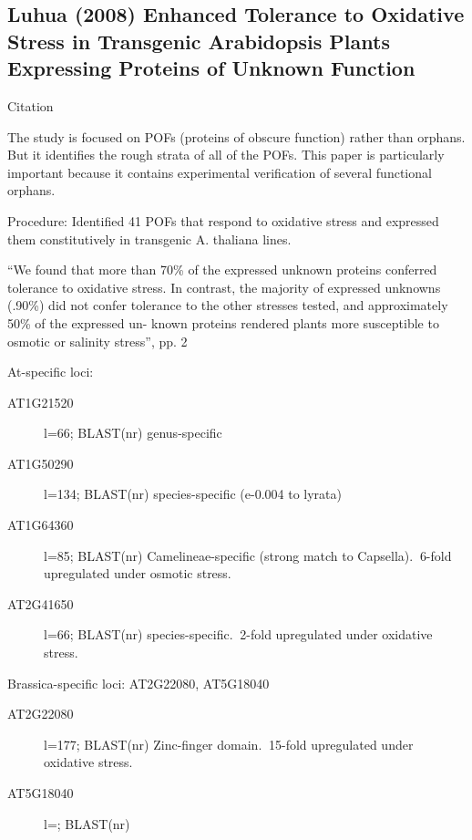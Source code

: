     
\subsection{Luhua (2008) Enhanced Tolerance to Oxidative Stress in Transgenic
Arabidopsis Plants Expressing Proteins of Unknown Function}

Citation \cite{luhua_enhanced_2008}

The study is focused on POFs (proteins of obscure function) rather than
orphans. But it identifies the rough strata of all of the POFs. This paper
is particularly important because it contains experimental verification of
several functional orphans.

Procedure: Identified 41 POFs that respond to oxidative stress and
expressed them constitutively in transgenic A. thaliana lines.

``We found that more than 70\% of the expressed unknown proteins conferred
tolerance to oxidative stress. In contrast, the majority of expressed
unknowns (.90\%) did not confer tolerance to the other stresses tested, and
approximately 50\% of the expressed un- known proteins rendered plants more
susceptible to osmotic or salinity stress'', pp. 2

At-specific loci:

\begin{description}

    \item[AT1G21520] l=66; BLAST(nr) genus-specific 

    \item[AT1G50290] l=134; BLAST(nr) species-specific (e-0.004 to lyrata)

    \item[AT1G64360] l=85; BLAST(nr) Camelineae-specific (strong match to
        Capsella). $~$6-fold upregulated under osmotic stress.
    
    \item[AT2G41650] l=66; BLAST(nr) species-specific. $~$2-fold
        upregulated under oxidative stress.
        
\end{description}

Brassica-specific loci: AT2G22080, AT5G18040

\begin{description}

    \item[AT2G22080] l=177; BLAST(nr) Zinc-finger domain. $~$15-fold
        upregulated under oxidative stress.

    \item[AT5G18040] l=; BLAST(nr)

\end{description}

